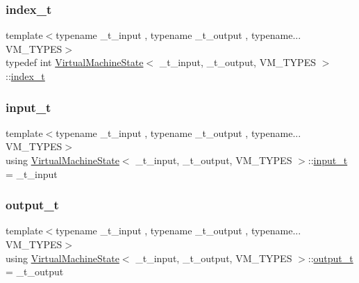 \subsubsection{\texorpdfstring{index\+\_\+t}{index\_t}}
{\footnotesize\ttfamily template$<$typename \+\_\+t\+\_\+input , typename \+\_\+t\+\_\+output , typename... V\+M\+\_\+\+T\+Y\+P\+ES$>$ \\
typedef int \hyperlink{class_virtual_machine_state}{Virtual\+Machine\+State}$<$ \+\_\+t\+\_\+input, \+\_\+t\+\_\+output, V\+M\+\_\+\+T\+Y\+P\+ES $>$\+::\hyperlink{class_virtual_machine_state_a95ba2f54f65b778c8a012ea3e7a0ee50}{index\+\_\+t}}

\mbox{\label{class_virtual_machine_state_aeb5e01ec57466fd3734e0c29f2b8da0a}} 
\subsubsection{\texorpdfstring{input\+\_\+t}{input\_t}}
{\footnotesize\ttfamily template$<$typename \+\_\+t\+\_\+input , typename \+\_\+t\+\_\+output , typename... V\+M\+\_\+\+T\+Y\+P\+ES$>$ \\
using \hyperlink{class_virtual_machine_state}{Virtual\+Machine\+State}$<$ \+\_\+t\+\_\+input, \+\_\+t\+\_\+output, V\+M\+\_\+\+T\+Y\+P\+ES $>$\+::\hyperlink{class_virtual_machine_state_aeb5e01ec57466fd3734e0c29f2b8da0a}{input\+\_\+t} =  \+\_\+t\+\_\+input}

\mbox{\label{class_virtual_machine_state_a1015cee5061f82f82ef6a953b51f9bd5}} 
\subsubsection{\texorpdfstring{output\+\_\+t}{output\_t}}
{\footnotesize\ttfamily template$<$typename \+\_\+t\+\_\+input , typename \+\_\+t\+\_\+output , typename... V\+M\+\_\+\+T\+Y\+P\+ES$>$ \\
using \hyperlink{class_virtual_machine_state}{Virtual\+Machine\+State}$<$ \+\_\+t\+\_\+input, \+\_\+t\+\_\+output, V\+M\+\_\+\+T\+Y\+P\+ES $>$\+::\hyperlink{class_virtual_machine_state_a1015cee5061f82f82ef6a953b51f9bd5}{output\+\_\+t} =  \+\_\+t\+\_\+output}

